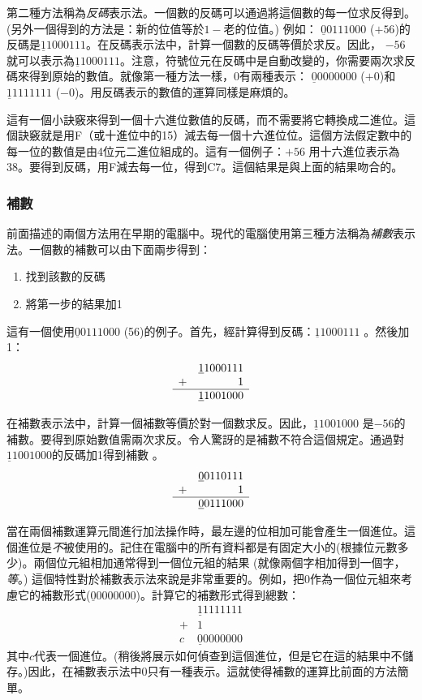 第二種方法稱為\emph{反碼}表示法。一個數的反碼可以通過將這個數的每一位求反得到。
(另外一個得到的方法是：新的位值等於$1 - $老的位值。) 例如：
$\underline{0}0111000$
($+56$)的反碼是$\underline{1}1000111$。在反碼表示法中，計算一個數的反碼等價於求反。因此，
$-56$就可以表示為$\underline{1}1000111$。注意，符號位元在反碼中是自動改變的，你需要兩次求反碼來得到原始的數值。就像第一種方法一樣，0有兩種表示：
$\underline{0}0000000$ ($+0$)和$\underline{1}1111111$
($-0$)。用反碼表示的數值的運算同樣是麻煩的。

這有一個小訣竅來得到一個十六進位數值的反碼，而不需要將它轉換成二進位。這個訣竅就是用F（或十進位中的15）減去每一個十六進位位。這個方法假定數中的每一位的數值是由4位元二進位組成的。這有一個例子：$+56$ 用十六進位表示為38。要得到反碼，用F減去每一位，得到C7。這個結果是與上面的結果吻合的。

\subsubsection{補數 
               }

前面描述的兩個方法用在早期的電腦中。現代的電腦使用第三種方法稱為\emph{補數}表示法。一個數的補數可以由下面兩步得到：
\begin{enumerate}
\item 找到該數的反碼
\item 將第一步的結果加1
\end{enumerate}
這有一個使用$\underline{0}0111000$ (56)的例子。首先，經計算得到反碼：$\underline{1}1000111$ 。然後加1：
\[
\begin{array}{rr}
 & \underline{1}1000111 \\
+&                    1 \\ \hline
 & \underline{1}1001000
\end{array}
\]

在補數表示法中，計算一個補數等價於對一個數求反。因此，$\underline{1}1001000$
是$-56$的補數。要得到原始數值需兩次求反。令人驚訝的是補數不符合這個規定。通過對$\underline{1}1001000$的反碼加1得到補數
。
\[
\begin{array}{rr}
 & \underline{0}0110111 \\
+&                    1 \\ \hline
 & \underline{0}0111000
\end{array}
\]

當在兩個補數運算元間進行加法操作時，最左邊的位相加可能會產生一個進位。這個進位是\emph{不}被使用的。記住在電腦中的所有資料都是有固定大小的(根據位元數多少)。兩個位元組相加通常得到一個位元組的結果
(就像兩個字相加得到一個字，{\em 等\/}。)
這個特性對於補數表示法來說是非常重要的。例如，把0作為一個位元組來考慮它的補數形式($\underline{0}0000000$)。計算它的補數形式得到總數：
\[
\begin{array}{rr}
 & \underline{1}1111111 \\
+&                    1 \\ \hline
c& \underline{0}0000000
\end{array}
\]
其中$c$代表一個進位。(稍後將展示如何偵查到這個進位，但是它在這的結果中不儲存。)因此，在補數表示法中0只有一種表示。這就使得補數的運算比前面的方法簡單。


